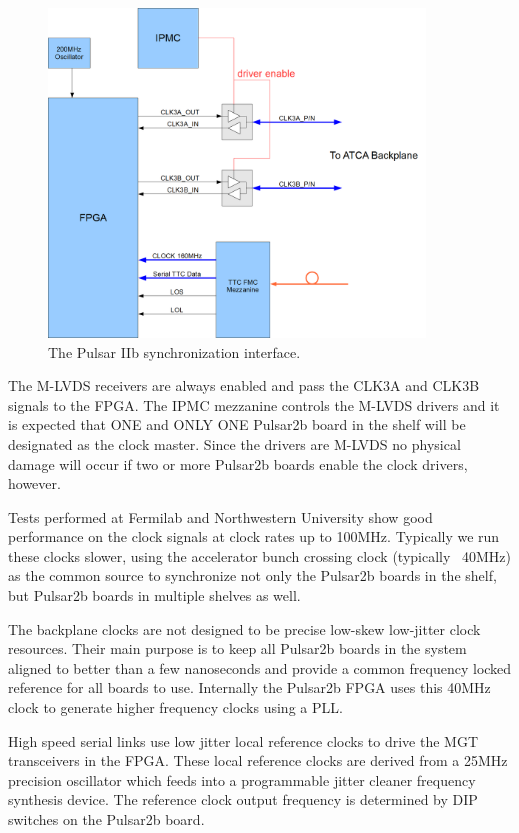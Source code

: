 \documentclass[letterpaper]{article}
\begin{document}
\begin{figure}
\centering
\includegraphics[width=10cm]{sync.png}
\caption{The Pulsar IIb synchronization interface.}
\label{sync}
\end{figure}

The M-LVDS receivers are always enabled and pass the CLK3A and CLK3B signals to the FPGA.  The IPMC mezzanine controls the M-LVDS drivers and it is expected that ONE and ONLY ONE Pulsar2b board in the shelf will be designated as the clock master.  Since the drivers are M-LVDS no physical damage will occur if two or more Pulsar2b boards enable the clock drivers, however.

Tests performed at Fermilab and Northwestern University show good performance on the clock signals at clock rates up to 100MHz.  Typically we run these clocks slower, using the accelerator bunch crossing clock (typically ~40MHz) as the common source to synchronize not only the Pulsar2b boards in the shelf, but Pulsar2b boards in multiple shelves as well.

The backplane clocks are not designed to be precise low-skew low-jitter clock resources.  Their main purpose is to keep all Pulsar2b boards in the system aligned to better than a few nanoseconds and provide a common frequency locked reference for all boards to use.  Internally the Pulsar2b FPGA uses this 40MHz clock to generate higher frequency clocks using a PLL.  

High speed serial links use low jitter local reference clocks to drive the MGT transceivers in the FPGA.  These local reference clocks are derived from a 25MHz precision oscillator which feeds into a programmable jitter cleaner frequency synthesis device.  The reference clock output frequency is determined by DIP switches on the Pulsar2b board.
\end{document}
